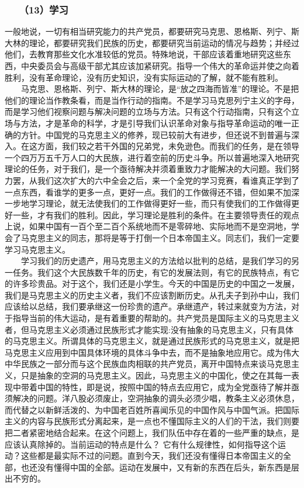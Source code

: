 \documentclass[cn,11pt,chinese]{elegantbook}
\def\myformat#1{\hfil\hfil #1}
\begin{document}
\subsubsection*{\myformat{　　（13）学习}}
一般地说，一切有相当研究能力的共产党员，都要研究马克思、恩格斯、列宁、斯大林的理论，都要研究我们民族的历史，都要研究当前运动的情况与趋势；并经过他们，去教育那些文化水准较低的党员。特殊地说，干部应该着重地研究这些东西，中央委员会与高级干部尤其应该加紧研究。指导一个伟大的革命运并使之向着胜利，没有革命理论，没有历史知识，没有实际运动的了解，就不能有胜利。\\
　　马克思、恩格斯、列宁、斯大林的理论，是“放之四海而皆准”的理论。不是把他们的理论当作教条看，而是当作行动的指南。不是学习马克思列宁主义的字母，而是学习他们视察问题与解决问题的立场与方法。只有这个行动指南，只有这个立场与方法，才是革命的科学，才是引导我们认识革命对象与指导革命运动的唯一正确的方针。中国党的马克思主义的修养，现已较前大有进步，但还说不到普遍与深入。在这方面，我们较之若干外国的兄弟党，未免逊色。而我们的任务，是在领导一个四万万五千万人口的大民族，进行着空前的历史斗争。所以普遍地深入地研究理论的任务，对于我们，是一个亟待解决并须着重致力才能解决的大问题。我们努力罢，从我们这次扩大的六中全会之后，来一个全党的学习竞赛，看谁真正学到了一点东西，看谁学的更多一点，更好一点。我们的工作做得还不错，但如果不加深一步地学习理论，就无法使我们的工作做得更好一些，而只有使我们的工作做得更好一些，才有我们的胜利。因此，学习理论是胜利的条件。在主要领导责任的观点上说，如果中国有一百个至二百个系统地而不是零碎地、实际地而不是空洞地，学会了马克思主义的同志，那将是等于打倒一个日本帝国主义。同志们，我们一定要学习马克思主义。\\
　　学习我们的历史遗产，用马克思主义的方法给以批判的总结，是我们学习的另一任务。我们这个大民族数千年的历史，有它的发展法则，有它的民族特点，有它的许多珍贵品。对于这个，我们还是小学生。今天的中国是历史的中国之一发展，我们是马克思主义的历史主义者，我们不应该割断历史。从孔夫子到孙中山，我们应该给以总结，我们要承继这一份珍贵的遗产。承继遗产，转过来就变为方法，对于指导当前的伟大运动，是有着重要的帮助的。共产党员是国际主义的马克思主义者，但马克思主义必须通过民族形式才能实现:没有抽象的马克思主义，只有具体的马克思主义。所谓具体的马克思主义，就是通过民族形式的马克思主义，就是把马克思主义应用到中国具体环境的具体斗争中去，而不是抽象地应用它。成为伟大中华民族之一部分而与这个民族血肉相联的共产党员，离开中国特点来谈马克思主义，只是抽象的空洞的马克思主义。因此，马克思主义的中国化，使之在其每一表现中带着中国的特性，即是说，按照中国的特点去应用它，成为全党亟待了解并亟须解决的问题。洋八股必须废止，空洞抽象的调头必须少唱，教条主义必须休息，而代替之以新鲜活泼的、为中国老百姓所喜闻乐见的中国作风与中国气派。把国际主义的内容与民族形式分离起来，是一点也不懂国际主义的人们的干法，我们则要把二者紧密地结合起来。在这个问题上，我们队伍中存在着的一些严重的缺点，是应该认真除掉的。当前运动的特点是什么？  它有什么规律性，如何指导这个运动？这些都是最实际不过的问题。直到今天，我们还没有懂得日本帝国主义的全部，也还没有懂得中国的全部。运动在发展中，又有新的东西在后头，新东西是层出不穷的。\\
\end{document}

